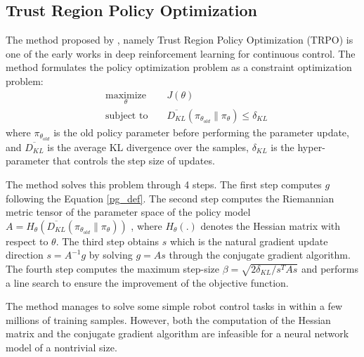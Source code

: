 \subsection{Trust Region Policy Optimization}
The method proposed by \cite{schulman2015trust}, namely Trust Region Policy Optimization (TRPO) is one of the early works in deep reinforcement learning for continuous control. The method formulates the policy optimization problem as a constraint optimization problem:
\begin{equation}
    \begin{aligned}
&    \underset{\theta}{\text{maximize}} 
&& J(\theta) \\
& \text{subject to } 
&& \overline{D_{KL}}(\pi_{\theta_{old}}\|\pi_\theta) \leq \delta_{KL}\label{trpo_obj}\end{aligned}
\end{equation}
where $\pi_{\theta_{old}}$ is the old policy parameter before performing the parameter update, and $\overline{D_{KL}}$ is the average KL divergence over the samples, $\delta_{KL}$ is the hyper-parameter that controls the step size of updates.

The method solves this problem through 4 steps. The first step computes $g$ following the Equation \ref{pg_def}. 
The second step computes the Riemannian metric tensor of the parameter space of the policy model $A = H_{\theta}\left(\overline{D_{KL}}(\pi_{\theta_{old}}\|\pi_\theta)\right)$ , where $H_{\theta}(.)$ denotes the Hessian matrix with respect to $\theta$. 
The third step obtains $s$ which is the natural gradient update direction $s=A^{-1}g$ by solving $g=As$ through the conjugate gradient algorithm.
The fourth step computes the maximum step-size $\beta= \sqrt{2\delta_{KL}/s^TAs}$ and performs a line search to ensure the improvement of the objective function.

The method manages to solve some simple robot control tasks in \cite{openaigym} within a few millions of training samples. However, both the computation of the Hessian matrix and the conjugate gradient algorithm are infeasible for a neural network model of a nontrivial size.

